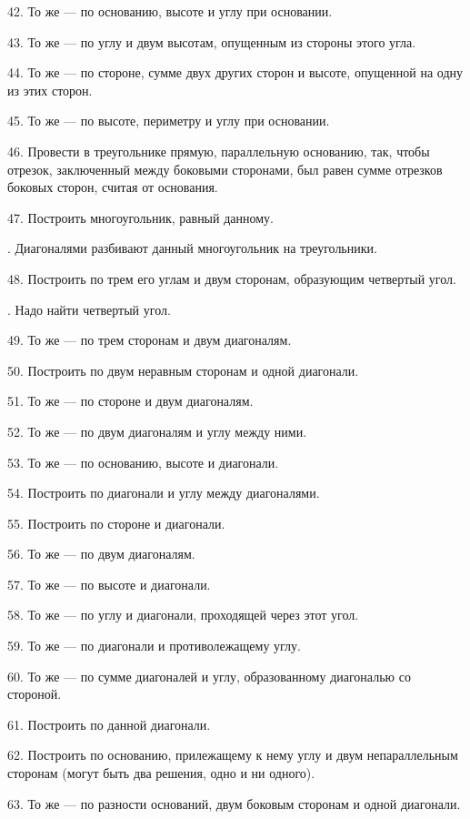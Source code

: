 \documentclass[oneside]{book}
\begin{document}
42.
То же — по основанию, высоте и углу при основании.

43.
То же — по углу и двум высотам, опущенным из стороны этого угла.

44.
То же — по стороне, сумме двух других сторон и высоте, опущенной на одну из этих сторон.

45.
То же — по высоте, периметру и углу при основании.

46.
Провести в треугольнике прямую, параллельную основанию, так, чтобы отрезок, заключенный между боковыми сторонами, был равен сумме отрезков боковых сторон, считая от основания.

47.
Построить многоугольник, равный данному.

.
Диагоналями разбивают данный многоугольник на треугольники.

48.
Построить  по трем его углам и двум сторонам, образующим четвертый угол.

.
Надо найти четвертый угол.

49.
То же — по трем сторонам и двум диагоналям.

50.
Построить  по двум неравным сторонам и одной диагонали.

51.
То же — по стороне и двум диагоналям.

52.
То же — по двум диагоналям и углу между ними.

53.
То же — по основанию, высоте и диагонали.

54.
Построить  по диагонали и углу между диагоналями.

55.
Построить  по стороне и диагонали.

56.
То же — по двум диагоналям.

57.
То же — по высоте и диагонали.

58.
То же — по углу и диагонали, проходящей через этот угол.

59.
То же — по диагонали и противолежащему углу.

60.
То же — по сумме диагоналей и углу, образованному диагональю со стороной.

61.
Построить  по данной диагонали.

62.
Построить  по основанию, прилежащему к нему углу и двум непараллельным сторонам (могут быть два решения, одно и ни одного).

63.
То же — по разности оснований, двум боковым сторонам и одной диагонали.
\end{document}

